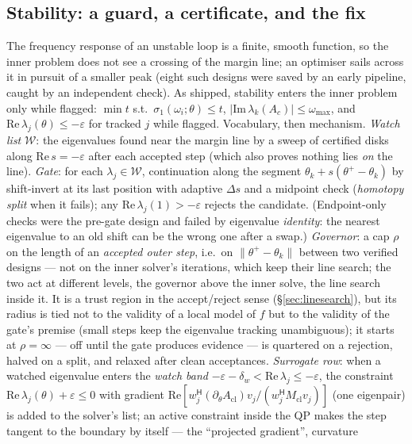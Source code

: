 \documentclass[11pt,a4paper]{article}
\newcommand{\eps}{\varepsilon}
\newcommand{\rev}[1]{#1}
\begin{document}
\subsection{Stability: a guard, a certificate, and the fix}
\label{sec:stability}
The frequency response of an unstable loop is a finite, smooth function, so the inner
problem does not see a crossing of the margin line; an optimiser sails across it in
pursuit of a smaller peak (eight such designs were saved by an early pipeline, caught by
an independent check).  As shipped, stability enters the inner problem only while
flagged: $\min t$ s.t.\ $\sigma_1(\omega_i;\theta)\le t$, $|\mathrm{Im}\,\lambda_k(A_c)|\le\omega_{\max}$,
and $\mathrm{Re}\,\lambda_j(\theta)\le-\eps$ for tracked $j$ while flagged.  Vocabulary,
then mechanism.  \emph{Watch list} $\mathcal W$: the eigenvalues found near the margin
line by a sweep of certified disks along $\mathrm{Re}\,s=-\eps$ after each accepted step
(which also proves nothing lies \emph{on} the line).  \emph{Gate}: for each
$\lambda_j\in\mathcal W$, continuation along the segment $\theta_k+s(\theta^+-\theta_k)$
by shift-invert at its last position with adaptive $\Delta s$ and a midpoint check
(\emph{homotopy split} when it fails); any $\mathrm{Re}\,\lambda_j(1)>-\eps$ rejects the
candidate.  (Endpoint-only checks were the pre-gate design and failed by eigenvalue
\emph{identity}: the nearest eigenvalue to an old shift can be the wrong one after a
swap.)  \rev{\emph{Governor}: a cap $\rho$ on the length of an \emph{accepted outer step},
i.e.\ on $\|\theta^+-\theta_k\|$ between two verified designs --- not on the inner
solver's iterations, which keep their line search; the two act at different levels, the
governor above the inner solve, the line search inside it.  It is a trust region in the
accept/reject sense (\S\ref{sec:linesearch}), but its radius is tied not to the
validity of a local model of $f$ but to the validity of the gate's premise (small steps
keep the eigenvalue tracking unambiguous); it starts at $\rho=\infty$ --- off until the
gate produces evidence --- is quartered on a rejection, halved on a split, and relaxed
after clean acceptances.}  \emph{Surrogate row}: when a watched
eigenvalue enters the \emph{watch band} $-\eps-\delta_w<\mathrm{Re}\,\lambda_j\le-\eps$,
the constraint $\mathrm{Re}\,\lambda_j(\theta)+\eps\le0$ with gradient
$\mathrm{Re}[w_j^{\mathsf H}(\partial_\theta A_{\mathrm{cl}})v_j/(w_j^{\mathsf H}M_{\mathrm{cl}}v_j)]$
(one eigenpair) is added to the solver's list; an active constraint inside the QP makes
the step tangent to the boundary by itself --- the ``projected gradient'', curvature
\end{document}
